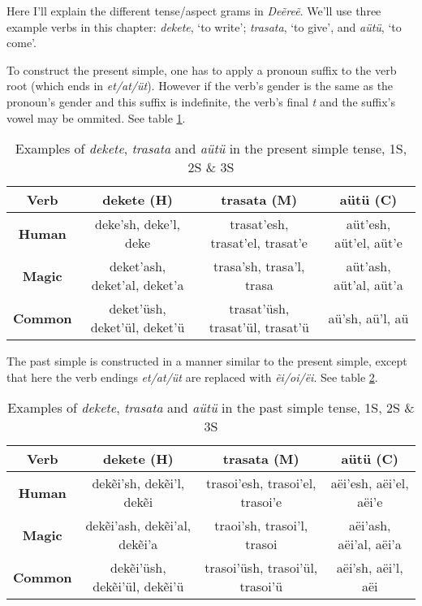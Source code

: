 Here I’ll explain the different tense/aspect grams in \emph{Deẽreẽ}. We’ll use three example verbs in this chapter: \emph{dekete}, ‘to write’; \emph{trasata}, ‘to give’, and \emph{aütü}, ‘to come’.

To construct the present simple, one has to apply a pronoun suffix to the verb root (which ends in \emph{et/at/üt}).
However if the verb’s gender is the same as the pronoun’s gender and this suffix is indefinite,
the verb’s final \emph{t} and the suffix’s vowel may be ommited.
See table \ref{tab:conj-present-simple}.

\begin{table}[h]
\begin{center}
\begin{tabular}{|c|c|c|c|}\hline

\textbf{Verb}   & dekete (H) & trasata (M) & aütü (C) \\\hline
\textbf{Human}  & deke’sh, deke’l, deke & trasat’esh, trasat’el, trasat’e & aüt’esh, aüt’el, aüt’e \\\hline
\textbf{Magic}  & deket’ash, deket’al, deket’a & trasa’sh, trasa’l, trasa & aüt’ash, aüt’al, aüt’a \\\hline
\textbf{Common} & deket’üsh, deket’ül, deket’ü & trasat’üsh, trasat’ül, trasat’ü & aü’sh, aü’l, aü \\\hline

\end{tabular}
\end{center}
\caption{Examples of \emph{dekete}, \emph{trasata} and \emph{aütü} in the present simple tense, 1S, 2S \& 3S}
\label{tab:conj-present-simple}
\end{table}

The past simple is constructed in a manner similar to the present simple, except that here the verb endings \emph{et/at/üt}
are replaced with \emph{ẽi/oi/ëi}.
See table \ref{tab:conj-past-simple}.

\begin{table}[h]
\begin{center}
\begin{tabular}{|c|c|c|c|}\hline

\textbf{Verb}   & dekete (H) & trasata (M) & aütü (C) \\\hline
\textbf{Human}  & dekẽi’sh, dekẽi’l, dekẽi & trasoi’esh, trasoi’el, trasoi’e & aëi’esh, aëi’el, aëi’e \\\hline
\textbf{Magic}  & dekẽi’ash, dekẽi’al, dekẽi’a & traoi’sh, trasoi’l, trasoi & aëi’ash, aëi’al, aëi’a \\\hline
\textbf{Common} & dekẽi’üsh, dekẽi’ül, dekẽi’ü & trasoi’üsh, trasoi’ül, trasoi’ü & aëi’sh, aëi’l, aëi \\\hline

\end{tabular}
\end{center}
\caption{Examples of \emph{dekete}, \emph{trasata} and \emph{aütü} in the past simple tense, 1S, 2S \& 3S}
\label{tab:conj-past-simple}
\end{table}

